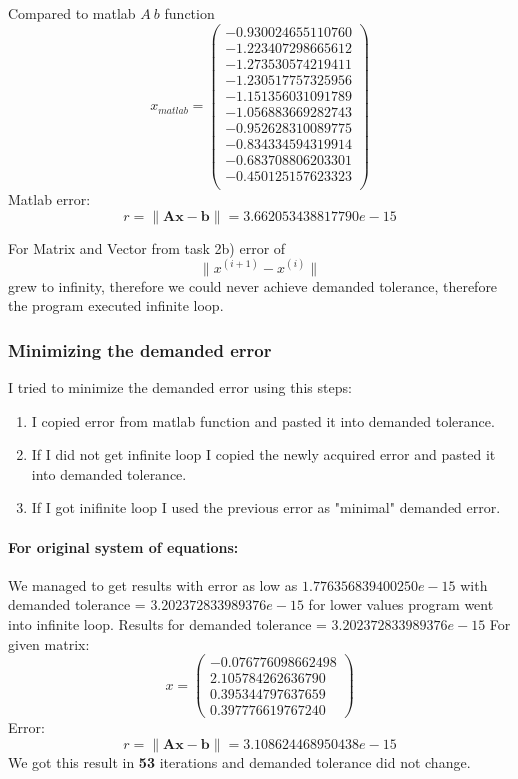 \documentclass[12pt]{report}
\begin{document}
Compared to matlab $ A \ b $ function
\[ x_{matlab} = \left( \begin{array}{cc}
  -0.930024655110760 \\
  -1.223407298665612 \\
  -1.273530574219411 \\
  -1.230517757325956 \\
  -1.151356031091789 \\
  -1.056883669282743 \\
  -0.952628310089775 \\
  -0.834334594319914 \\
  -0.683708806203301 \\
  -0.450125157623323 \\
\end{array} \right)
\]
Matlab error:
\[ r = \| \mathbf{A}\mathbf{x} - \mathbf{b}\| = 3.662053438817790e-15 \]

For Matrix and Vector from task 2b) error of
\[ \| x^{(i+1)} - x^{(i)} \| \]
grew to infinity, therefore we could never achieve demanded tolerance, therefore the program executed infinite loop.

\subsubsection{Minimizing the demanded error}
I tried to minimize the demanded error using this steps:
\begin{enumerate}
\item I copied error from matlab function and pasted it into demanded tolerance.
\item If I did not get infinite loop I copied the newly acquired error and pasted it into demanded tolerance.
\item If I got inifinite loop I used the previous error as "minimal" demanded error.
\end{enumerate}
\newpage
\paragraph{For original system of equations:}
We managed to get results with error as low as $1.776356839400250e-15$ with demanded tolerance = $3.202372833989376e-15$ for lower values program went into infinite loop.
Results for demanded tolerance = $3.202372833989376e-15$
For given matrix:
\[ x = \left( \begin{array}{cc}
  -0.076776098662498 \\
   2.105784262636790 \\
   0.395344797637659 \\
   0.397776619767240
\end{array} \right)
\]
Error:
\[ r = \| \mathbf{A}\mathbf{x} - \mathbf{b}\| = 3.108624468950438e-15 \]
We got this result in \textbf{53} iterations and demanded tolerance did not change.
\end{document}

